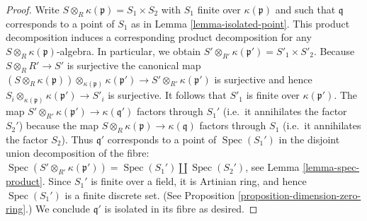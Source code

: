 \documentclass[10pt,a4paper]{amsart}
\theoremstyle{plain}
\theoremstyle{definition}
\theoremstyle{remark}
\numberwithin{equation}{subsection}
\def\Spec{\mathop{\mathrm{Spec}}}
\begin{document}
\begin{proof}
Write $S \otimes_R \kappa(\mathfrak p) = S_1 \times S_2$
with $S_1$ finite over $\kappa(\mathfrak p)$ and such that
$\mathfrak q$ corresponds to a point of $S_1$ as in
Lemma \ref{lemma-isolated-point}. This product decomposition
induces a corresponding product decomposition for any
$S \otimes_R \kappa(\mathfrak p)$-algebra. In particular,
we obtain $S' \otimes_{R'} \kappa(\mathfrak p') = S'_1 \times S'_2$.
Because $S \otimes_R R' \to S'$ is surjective the canonical map
$(S \otimes_R \kappa(\mathfrak p)) \otimes_{\kappa(\mathfrak p)}
\kappa(\mathfrak p') \to S' \otimes_{R'} \kappa(\mathfrak p')$
is surjective and hence
$S_i \otimes_{\kappa(\mathfrak p)} \kappa(\mathfrak p') \to S'_i$
is surjective. It follows that $S'_1$ is finite over $\kappa(\mathfrak p')$.
The map $S' \otimes_{R'} \kappa(\mathfrak p') \to
\kappa(\mathfrak q')$ factors through $S_1'$
(i.e.\ it annihilates the factor $S_2'$)
because the map $S \otimes_R \kappa(\mathfrak p) \to
\kappa(\mathfrak q)$ factors through $S_1$
(i.e.\ it annihilates the factor $S_2$). Thus
$\mathfrak q'$ corresponds to a point of
$\Spec(S_1')$ in the disjoint union decomposition
of the fibre: $\Spec(S' \otimes_{R'} \kappa(\mathfrak p'))
= \Spec(S_1') \amalg \Spec(S_2')$, see
Lemma \ref{lemma-spec-product}.
Since $S_1'$ is finite over a field, it is Artinian ring,
and hence $\Spec(S_1')$ is a finite discrete set.
(See Proposition \ref{proposition-dimension-zero-ring}.)
We conclude $\mathfrak q'$ is isolated in its fibre as
desired.
\end{proof}
\end{document}
